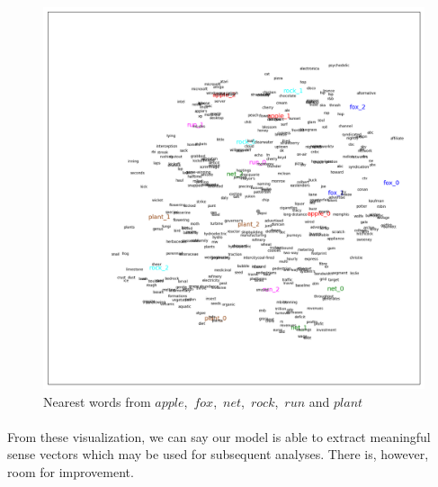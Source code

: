\begin{figure}[tb]
  \centering
	\includegraphics[width=1.0\textwidth]{some20} 
	\caption{Nearest words from $apple$,\ $fox$,\ $net$,\ $rock$,\ $run$ and $plant$}
	\label{fig:keywords20}
\end{figure}

\paragraph{} From these visualization, we can say our model is able to extract meaningful sense vectors which may be used for subsequent analyses. There is, however, room for improvement.
